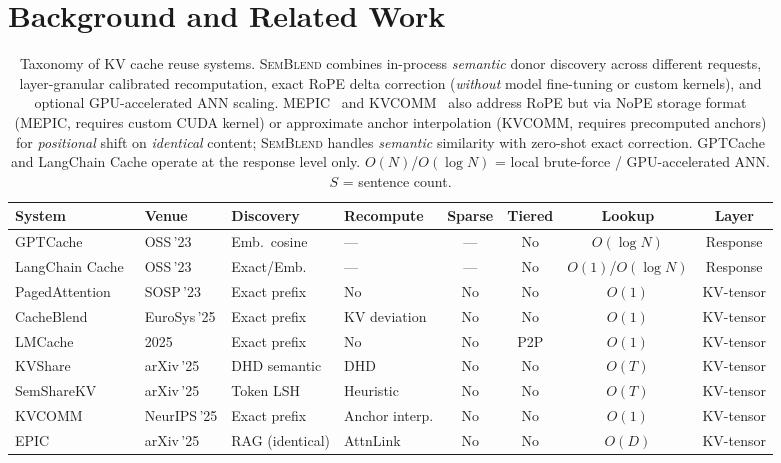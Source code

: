 \documentclass[10pt,twocolumn]{article}
\newcommand{\semblend}{\textsc{SemBlend}\xspace}
\begin{document}
\section{Background and Related Work}
\label{sec:related}

\begin{table}[t]
\centering
\caption{Taxonomy of KV cache reuse systems. \semblend combines
in-process \emph{semantic} donor discovery across different requests,
layer-granular calibrated recomputation, exact RoPE delta correction
(\emph{without} model fine-tuning or custom kernels), and optional GPU-accelerated ANN scaling.
MEPIC~\cite{mepic} and KVCOMM~\cite{kvcomm} also address RoPE but
via NoPE storage format (MEPIC, requires custom CUDA kernel) or
approximate anchor interpolation (KVCOMM, requires precomputed anchors)
for \emph{positional} shift on \emph{identical} content; \semblend handles
\emph{semantic} similarity with zero-shot exact correction.
GPTCache and LangChain Cache operate at the response level only.
$O(N)$/$O(\log N)$ = local brute-force / GPU-accelerated ANN.
$S$ = sentence count.}
\label{tab:taxonomy}
\scriptsize
\setlength{\tabcolsep}{2.5pt}
\begin{tabular}{@{}llllcccc@{}}
\toprule
\textbf{System} & \textbf{Venue} & \textbf{Discovery} & \textbf{Recompute} &
  \textbf{Sparse} & \textbf{Tiered} & \textbf{Lookup} & \textbf{Layer} \\
\midrule
GPTCache~\cite{gptcache} & OSS\,'23 & Emb.\ cosine & --- & --- & No & $O(\log N)$ & Response \\
LangChain Cache~\cite{langchain} & OSS\,'23 & Exact/Emb. & --- & --- & No & $O(1)$/$O(\log N)$ & Response \\
PagedAttention~\cite{pagedattention} & SOSP\,'23 & Exact prefix & No & No & No & $O(1)$ & KV-tensor \\
CacheBlend~\cite{cacheblend} & EuroSys\,'25 & Exact prefix & KV deviation & No & No & $O(1)$ & KV-tensor \\
LMCache~\cite{lmcache} & 2025 & Exact prefix & No & No & P2P & $O(1)$ & KV-tensor \\
KVShare~\cite{kvshare} & arXiv\,'25 & DHD semantic & DHD & No & No & $O(T)$ & KV-tensor \\
SemShareKV~\cite{semsharekv} & arXiv\,'25 & Token LSH & Heuristic & No & No & $O(T)$ & KV-tensor \\
KVCOMM~\cite{kvcomm} & NeurIPS\,'25 & Exact prefix & Anchor interp. & No & No & $O(1)$ & KV-tensor \\
EPIC~\cite{epic} & arXiv\,'25 & RAG (identical) & AttnLink & No & No & $O(D)$ & KV-tensor \\

\end{tabular}
\end{table}
\end{document}
